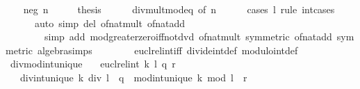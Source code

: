 \begin{isabellebody}
\isamarkupfalse%
\isanewline
\ \ \isamarkupfalse%
\ {\isacharparenleft}{\kern0pt}neg\ n{\isacharparenright}{\kern0pt}\isanewline
\ \ \isamarkupfalse%
\ \isamarkupfalse%
\ {\isacharquery}{\kern0pt}thesis\isanewline
\ \ \ \ \isamarkupfalse%
\ div{\isacharunderscore}{\kern0pt}mult{\isacharunderscore}{\kern0pt}mod{\isacharunderscore}{\kern0pt}eq\ {\isacharbrackleft}{\kern0pt}of\ n{\isacharbrackright}{\kern0pt}\isanewline
\ \ \ \ \isamarkupfalse%
\ {\isacharparenleft}{\kern0pt}cases\ l\ rule{\isacharcolon}{\kern0pt}\ int{\isacharunderscore}{\kern0pt}cases{}{\isacharparenright}{\kern0pt}\isanewline
\ \ \ \ \ \ {\isacharparenleft}{\kern0pt}auto\ simp\ del{\isacharcolon}{\kern0pt}\ of{\isacharunderscore}{\kern0pt}nat{\isacharunderscore}{\kern0pt}mult\ of{\isacharunderscore}{\kern0pt}nat{\isacharunderscore}{\kern0pt}add\isanewline
\ \ \ \ \ \ \ \ simp\ add{\isacharcolon}{\kern0pt}\ mod{\isacharunderscore}{\kern0pt}greater{\isacharunderscore}{\kern0pt}zero{\isacharunderscore}{\kern0pt}iff{\isacharunderscore}{\kern0pt}not{\isacharunderscore}{\kern0pt}dvd\ of{\isacharunderscore}{\kern0pt}nat{\isacharunderscore}{\kern0pt}mult\ {\isacharbrackleft}{\kern0pt}symmetric{\isacharbrackright}{\kern0pt}\ of{\isacharunderscore}{\kern0pt}nat{\isacharunderscore}{\kern0pt}add\ {\isacharbrackleft}{\kern0pt}symmetric{\isacharbrackright}{\kern0pt}\ algebra{\isacharunderscore}{\kern0pt}simps\isanewline
\ \ \ \ \ \ \ \ eucl{\isacharunderscore}{\kern0pt}rel{\isacharunderscore}{\kern0pt}int{\isacharunderscore}{\kern0pt}iff\ divide{\isacharunderscore}{\kern0pt}int{\isacharunderscore}{\kern0pt}def\ modulo{\isacharunderscore}{\kern0pt}int{\isacharunderscore}{\kern0pt}def{\isacharparenright}{\kern0pt}\isanewline
{}\isamarkupfalse%
%
\endisatagproof
{\isafoldproof}%
%
\isadelimproof
\isanewline
%
\endisadelimproof
\isanewline
{}\isamarkupfalse%
\ divmod{\isacharunderscore}{\kern0pt}int{\isacharunderscore}{\kern0pt}unique{\isacharcolon}{\kern0pt}\isanewline
\ \ \ {\isachardoublequoteopen}eucl{\isacharunderscore}{\kern0pt}rel{\isacharunderscore}{\kern0pt}int\ k\ l\ {\isacharparenleft}{\kern0pt}q{\isacharcomma}{\kern0pt}\ r{\isacharparenright}{\kern0pt}{\isachardoublequoteclose}\isanewline
\ \ \ div{\isacharunderscore}{\kern0pt}int{\isacharunderscore}{\kern0pt}unique{\isacharcolon}{\kern0pt}\ {\isachardoublequoteopen}k\ div\ l\ {\isacharequal}{\kern0pt}\ q{\isachardoublequoteclose}\ \ mod{\isacharunderscore}{\kern0pt}int{\isacharunderscore}{\kern0pt}unique{\isacharcolon}{\kern0pt}\ {\isachardoublequoteopen}k\ mod\ l\ {\isacharequal}{\kern0pt}\ r{\isachardoublequoteclose}\isanewline

\end{isabellebody}
